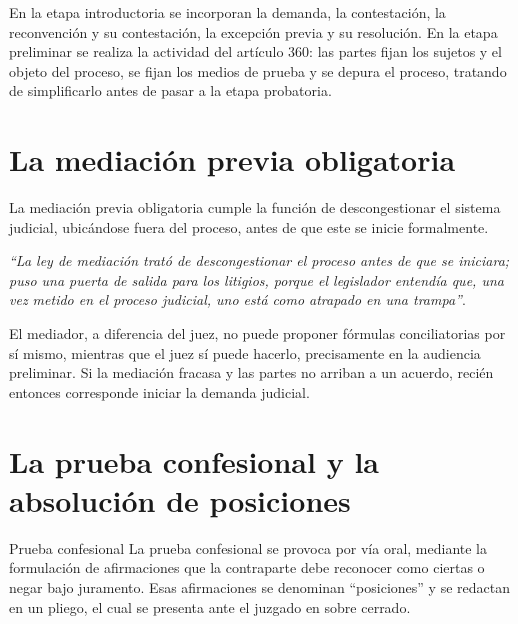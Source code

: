 \documentclass[12pt,oneside]{book}
\begin{document}
En la etapa introductoria se incorporan la demanda, la contestación, la reconvención y su contestación, la excepción previa y su resolución. En la etapa preliminar se realiza la actividad del artículo 360: las partes fijan los sujetos y el objeto del proceso, se fijan los medios de prueba y se depura el proceso, tratando de simplificarlo antes de pasar a la etapa probatoria.

\section{La mediación previa obligatoria}

La mediación previa obligatoria cumple la función de descongestionar el sistema judicial, ubicándose fuera del proceso, antes de que este se inicie formalmente.

\begin{note}
\textit{``La ley de mediación trató de descongestionar el proceso antes de que se iniciara; puso una puerta de salida para los litigios, porque el legislador entendía que, una vez metido en el proceso judicial, uno está como atrapado en una trampa''}.
\end{note}

El mediador, a diferencia del juez, no puede proponer fórmulas conciliatorias por sí mismo, mientras que el juez sí puede hacerlo, precisamente en la audiencia preliminar. Si la mediación fracasa y las partes no arriban a un acuerdo, recién entonces corresponde iniciar la demanda judicial.

\section{La prueba confesional y la absolución de posiciones}

\begin{definition}{Prueba confesional}
La prueba confesional se provoca por vía oral, mediante la formulación de afirmaciones que la contraparte debe reconocer como ciertas o negar bajo juramento. Esas afirmaciones se denominan ``posiciones'' y se redactan en un pliego, el cual se presenta ante el juzgado en sobre cerrado.
\end{definition}
\end{document}
